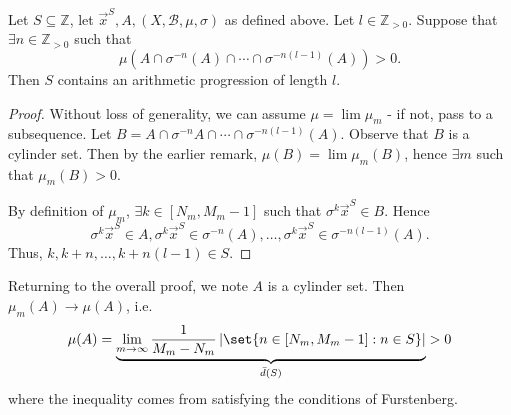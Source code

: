 \documentclass{article}
\begin{document}
\begin{prop}
  Let $S \subseteq \mathbb{Z}$, let $\vec{x}^S, A, (X, \mathcal{B}, \mu, \sigma)$ as defined above.
  Let $l \in \mathbb{Z}_{> 0}$.
  Suppose that $\exists n \in \mathbb{Z}_{>0}$ such that
  \begin{equation*}
    \mu\left(A \cap \sigma^{-n}(A) \cap \dotsb \cap \sigma^{-n(l-1)}(A)\right) > 0.
  \end{equation*}
  Then $S$ contains an arithmetic progression of length $l$.
\end{prop}
\begin{proof}
  Without loss of generality, we can assume $\mu = \lim \mu_m$ - if not, pass to a subsequence.
  Let $B = A \cap \sigma^{-n} A \cap \dotsb \cap \sigma^{-n (l-1)} (A).$
  Observe that $B$ is a cylinder set.
  Then by the earlier remark, $\mu(B) = \lim \mu_m(B)$, hence $\exists m$ such that $\mu_m(B) > 0$.

  By definition of $\mu_m$, $\exists k \in [N_m, M_m - 1]$ such that $\sigma^k \vec{x}^S \in B$.
  Hence
  \begin{equation*}\sigma^k \vec{x}^S \in A, \sigma^k \vec{x}^S \in \sigma^{-n}(A), \dotsc, \sigma^k \vec{x}^S \in \sigma^{-n(l-1)}(A).\end{equation*}
  Thus, $k, k+n, \dotsc, k + n(l-1) \in S$.
\end{proof}
Returning to the overall proof, we note $ A $ is a cylinder set.
Then $ \mu_m(A)\to\mu(A) $, i.e.\
\begin{equation*} \mu(A) = \underbrace{\lim_{m\to\infty}\frac{1}{M_m-N_m}\left|\set{n\in[N_m,M_m-1]: n\in S}\right|}_{\bar{d}(S)} > 0 \end{equation*}
where the inequality comes from satisfying the conditions of Furstenberg.

\printindex
\end{document}
